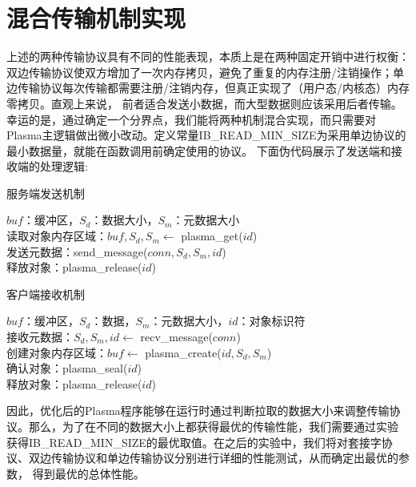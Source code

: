 \section{混合传输机制实现}

上述的两种传输协议具有不同的性能表现，本质上是在两种固定开销中进行权衡：双边传输协议使双方增加了一次内存拷贝，避免了重复的内存注册/注销操作；单边传输协议每次传输都需要注册/注销内存，但真正实现了（用户态/内核态）内存零拷贝。直观上来说，
前者适合发送小数据，而大型数据则应该采用后者传输。幸运的是，通过确定一个分界点，我们能将两种机制混合实现，而只需要对Plasma主逻辑做出微小改动。定义常量IB\_READ\_MIN\_SIZE为采用单边协议的最小数据量，就能在函数调用前确定使用的协议。
下面伪代码展示了发送端和接收端的处理逻辑:

\begin{algorithm}[h]
	\caption{服务端发送机制}\label{server}
	$buf$：缓冲区，$S_d$：数据大小，$S_m$：元数据大小 \\
	读取对象内存区域：$buf, S_d, S_m \leftarrow$ plasma\_get($id$) \\
	发送元数据：send\_message($conn, S_d, S_m, id$) \\
	释放对象：plasma\_release($id$)
\end{algorithm}

\begin{algorithm}[h]
	\caption{客户端接收机制}\label{client}
	$buf$：缓冲区，$S_d$：数据，$S_m$：元数据大小，$id$：对象标识符 \\
	接收元数据：$S_d, S_m, id \leftarrow$ recv\_message($conn$) \\
	创建对象内存区域：$buf \leftarrow$ plasma\_create($id, S_d, S_m$) \\
	确认对象：plasma\_seal($id$) \\
	释放对象：plasma\_release($id$) \\
\end{algorithm}

因此，优化后的Plasma程序能够在运行时通过判断拉取的数据大小来调整传输协议。那么，为了在不同的数据大小上都获得最优的传输性能，我们需要通过实验
获得IB\_READ\_MIN\_SIZE的最优取值。在之后的实验中，我们将对套接字协议、双边传输协议和单边传输协议分别进行详细的性能测试，从而确定出最优的参数，
得到最优的总体性能。